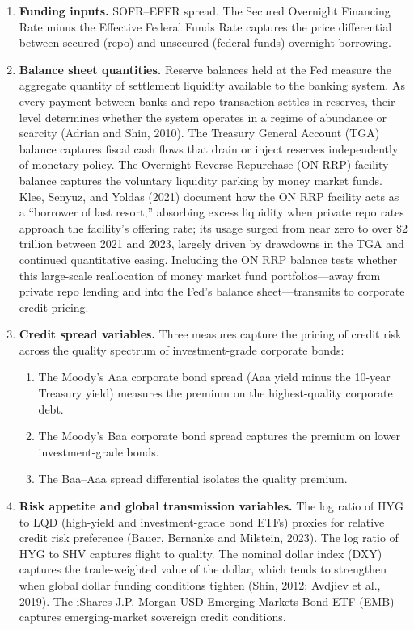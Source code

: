 \documentclass[12pt,a4paper]{article}
\begin{document}
\begin{enumerate}
  \item \textbf{Funding inputs.} SOFR--EFFR spread. The Secured Overnight Financing Rate minus the Effective Federal Funds Rate captures the price differential between secured (repo) and unsecured (federal funds) overnight borrowing.

  \item \textbf{Balance sheet quantities.} Reserve balances held at the Fed measure the aggregate quantity of settlement liquidity available to the banking system. As every payment between banks and repo transaction settles in reserves, their level determines whether the system operates in a regime of abundance or scarcity (Adrian and Shin, 2010). The Treasury General Account (TGA) balance captures fiscal cash flows that drain or inject reserves independently of monetary policy. The Overnight Reverse Repurchase (ON RRP) facility balance captures the voluntary liquidity parking by money market funds. Klee, Senyuz, and Yoldas (2021) document how the ON RRP facility acts as a ``borrower of last resort,'' absorbing excess liquidity when private repo rates approach the facility's offering rate; its usage surged from near zero to over \$2 trillion between 2021 and 2023, largely driven by drawdowns in the TGA and continued quantitative easing. Including the ON RRP balance tests whether this large-scale reallocation of money market fund portfolios---away from private repo lending and into the Fed's balance sheet---transmits to corporate credit pricing.

  \item \textbf{Credit spread variables.} Three measures capture the pricing of credit risk across the quality spectrum of investment-grade corporate bonds:
  \begin{enumerate}[label=(\alph*)]
    \item The Moody's Aaa corporate bond spread (Aaa yield minus the 10-year Treasury yield) measures the premium on the highest-quality corporate debt.
    \item The Moody's Baa corporate bond spread captures the premium on lower investment-grade bonds.
    \item The Baa--Aaa spread differential isolates the quality premium.
  \end{enumerate}

  \item \textbf{Risk appetite and global transmission variables.} The log ratio of HYG to LQD (high-yield and investment-grade bond ETFs) proxies for relative credit risk preference (Bauer, Bernanke and Milstein, 2023). The log ratio of HYG to SHV captures flight to quality. The nominal dollar index (DXY) captures the trade-weighted value of the dollar, which tends to strengthen when global dollar funding conditions tighten (Shin, 2012; Avdjiev et al., 2019). The iShares J.P. Morgan USD Emerging Markets Bond ETF (EMB) captures emerging-market sovereign credit conditions.
\end{enumerate}
\end{document}
